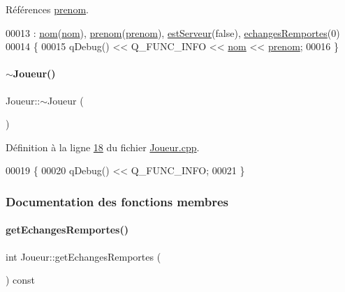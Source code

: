 Références \hyperlink{_joueur_8h_source_l00019}{prenom}.


\begin{DoxyCode}
00013                                           : \hyperlink{class_joueur_ab06d7f1e6b482299bb03919e0cd2166d}{nom}(\hyperlink{class_joueur_ab06d7f1e6b482299bb03919e0cd2166d}{nom}), \hyperlink{class_joueur_a96d4237143c2e57b8025c4e116e95909}{prenom}(\hyperlink{class_joueur_a96d4237143c2e57b8025c4e116e95909}{prenom}), 
      \hyperlink{class_joueur_ac22161c9510ed38d6c65cdf6315737a5}{estServeur}(\textcolor{keyword}{false}), \hyperlink{class_joueur_a23ab203e6bbfc1b2679a8457b99206dc}{echangesRemportes}(0)
00014 \{
00015     qDebug() << Q\_FUNC\_INFO << \hyperlink{class_joueur_ab06d7f1e6b482299bb03919e0cd2166d}{nom} << \hyperlink{class_joueur_a96d4237143c2e57b8025c4e116e95909}{prenom};
00016 \}
\end{DoxyCode}
\mbox{\label{class_joueur_a9fb594f755601ee77ce5884c4c0861f3}} 
\paragraph{\texorpdfstring{$\sim$\+Joueur()}{~Joueur()}}
{\footnotesize\ttfamily Joueur\+::$\sim$\+Joueur (\begin{DoxyParamCaption}{ }\end{DoxyParamCaption})}



Définition à la ligne \hyperlink{_joueur_8cpp_source_l00018}{18} du fichier \hyperlink{_joueur_8cpp_source}{Joueur.\+cpp}.


\begin{DoxyCode}
00019 \{
00020     qDebug() << Q\_FUNC\_INFO;
00021 \}
\end{DoxyCode}


\subsubsection{Documentation des fonctions membres}
\mbox{\label{class_joueur_affde221fc6d6bf633991fff4f11dd62b}} 
\paragraph{\texorpdfstring{get\+Echanges\+Remportes()}{getEchangesRemportes()}}
{\footnotesize\ttfamily int Joueur\+::get\+Echanges\+Remportes (\begin{DoxyParamCaption}{ }\end{DoxyParamCaption}) const}



